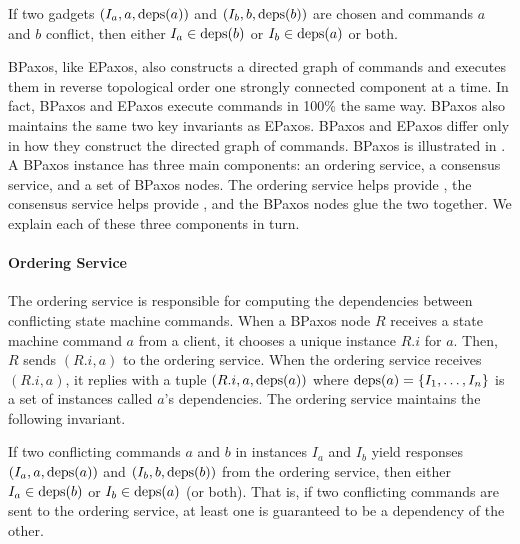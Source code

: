 \begin{boxedinvariant}
  If two gadgets $(I_a, a, \text{deps}(a))$ and $(I_b, b, \text{deps}(b))$ are chosen and
  commands $a$ and $b$ conflict, then either $I_a \in \text{deps}(b)$ or $I_b \in
  \text{deps}(a)$ or both.
\end{boxedinvariant}

BPaxos, like EPaxos, also constructs a directed graph of commands and executes
them in reverse topological order one strongly connected component at a time.
In fact, BPaxos and EPaxos execute commands in 100\% the same way. BPaxos also
maintains the same two key invariants as EPaxos. BPaxos and EPaxos differ only
in how they construct the directed graph of commands.
%
BPaxos is illustrated in . A BPaxos instance has three main
components: an ordering service, a consensus service, and a set of BPaxos
nodes. The ordering service helps provide , the
consensus service helps provide , and the BPaxos nodes
glue the two together. We explain each of these three components in turn.

{}

\paragraph{Ordering Service}
The ordering service is responsible for computing the dependencies between
conflicting state machine commands. When a BPaxos node $R$ receives a state
machine command $a$ from a client, it chooses a unique instance $R.i$ for $a$.
Then, $R$ sends $(R.i, a)$ to the ordering service. When the ordering service
receives $(R.i, a)$, it replies with a tuple $(R.i, a, \text{deps}(a))$ where
$\text{deps}(a) = \{I_1, \ldots, I_n\}$ is a set of instances called $a$'s
dependencies. The ordering service maintains the following invariant.

\begin{boxedinvariant}
If two conflicting commands $a$ and $b$ in instances $I_a$ and $I_b$ yield
responses $(I_a, a, \text{deps}(a))$ and $(I_b, b, \text{deps}(b))$ from the ordering
service, then either $I_a \in \text{deps}(b)$ or $I_b \in \text{deps}(a)$ (or both). That
is, if two conflicting commands are sent to the ordering service, at least one
is guaranteed to be a dependency of the other.
\end{boxedinvariant}

